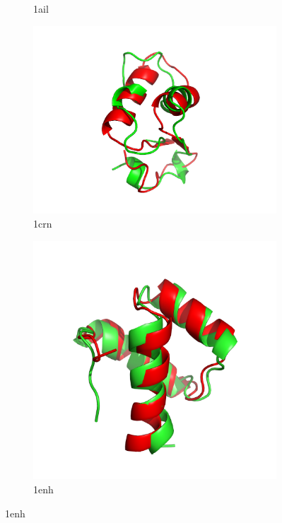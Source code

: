 \begin{figure}
\begin{subfigure}{0.24\linewidth}
    \caption{1ail}
    \label{fig:1ail-conformation}
  \end{subfigure}
%
  \begin{subfigure}{0.24\linewidth}
    \centering
    \includegraphics[width=0.9\linewidth]{Figuras/prots/1crn_render.png}
    \caption{1crn}
    \label{fig:1crn-conformation}
  \end{subfigure}
%
  \begin{subfigure}{0.24\linewidth}
    \centering
    \includegraphics[width=0.9\linewidth]{Figuras/prots/1enh_render.png}
    \caption{1enh}
    \label{fig:1enh-conformation}
  \end{subfigure}

\end{figure}
